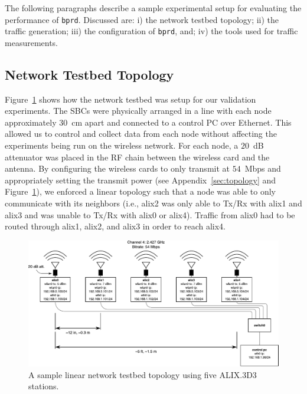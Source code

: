 \documentclass{article}
\newcommand{\bprd}{\texttt{bprd}\xspace}
\begin{document}
The following paragraphs describe a sample experimental setup for evaluating the performance of \bprd.
Discussed are:
i) the network testbed topology; 
ii) the traffic generation; 
iii) the configuration of \bprd, and; 
iv) the tools used for traffic measurements.


\subsection{Network Testbed Topology}

Figure~\ref{fig:linear} shows how the network testbed was setup for our validation experiments.
The SBCs were physically arranged in a line with each node approximately \(30\)~cm apart and connected to a control PC over Ethernet.
This allowed us to control and collect data from each node without affecting the experiments being run on the wireless network.
For each node, a \(20\)~dB attenuator was placed in the RF chain between the wireless card and the antenna.
By configuring the wireless cards to only transmit at \(54\)~Mbps and appropriately setting the transmit power (see Appendix~\ref{sec:topology} and Figure~\ref{fig:linear}), we enforced a linear topology such that a node was able to only communicate with its neighbors (i.e., alix2 was only able to Tx/Rx with alix1 and alix3 and was unable to Tx/Rx with alix0 or alix4).
Traffic from alix0 had to be routed through alix1, alix2, and alix3 in order to reach alix4.
%
\begin{figure}[!ht]
	\centering
	\includegraphics[width=\textwidth]{img/linear.pdf}
	\caption{A sample linear network testbed topology using five ALIX.3D3 stations.}
	\label{fig:linear}
\end{figure}


\end{document}
